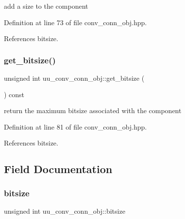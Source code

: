 add a size to the component 



Definition at line 73 of file conv\+\_\+conn\+\_\+obj.\+hpp.



References bitsize.

\mbox{\label{classuu__conv__conn__obj_a670323c83076fa3339e47686221635c8}} 
\subsubsection{\texorpdfstring{get\+\_\+bitsize()}{get\_bitsize()}}
{\footnotesize\ttfamily unsigned int uu\+\_\+conv\+\_\+conn\+\_\+obj\+::get\+\_\+bitsize (\begin{DoxyParamCaption}{ }\end{DoxyParamCaption}) const\hspace{0.3cm}{\ttfamily [inline]}}



return the maximum bitsize associated with the component 



Definition at line 81 of file conv\+\_\+conn\+\_\+obj.\+hpp.



References bitsize.



\subsection{Field Documentation}
\mbox{\label{classuu__conv__conn__obj_ae79020385840f1ad70fe513b6e69a113}} 
\subsubsection{\texorpdfstring{bitsize}{bitsize}}
{\footnotesize\ttfamily unsigned int uu\+\_\+conv\+\_\+conn\+\_\+obj\+::bitsize\hspace{0.3cm}{\ttfamily [private]}}



